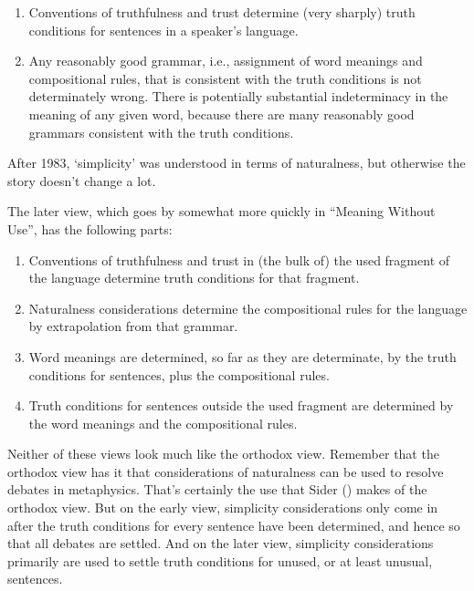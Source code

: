 \documentclass[
  11pt,
  letterpaper,
  DIV=11,
  numbers=noendperiod,
  twoside]{scrartcl}
\providecommand{\tightlist}{%
  \setlength{\itemsep}{0pt}\setlength{\parskip}{0pt}}
\begin{document}
\begin{enumerate}
\def\labelenumi{\arabic{enumi}.}
\tightlist
\item
  Conventions of truthfulness and trust determine (very sharply) truth
  conditions for sentences in a speaker's language.
\item
  Any reasonably good grammar, i.e., assignment of word meanings and
  compositional rules, that is consistent with the truth conditions is
  not determinately wrong. There is potentially substantial
  indeterminacy in the meaning of any given word, because there are many
  reasonably good grammars consistent with the truth conditions.
\end{enumerate}

After 1983, `simplicity' was understood in terms of naturalness, but
otherwise the story doesn't change a lot.

The later view, which goes by somewhat more quickly in ``Meaning Without
Use'', has the following parts:

\begin{enumerate}
\def\labelenumi{\arabic{enumi}.}
\tightlist
\item
  Conventions of truthfulness and trust in (the bulk of) the used
  fragment of the language determine truth conditions for that fragment.
\item
  Naturalness considerations determine the compositional rules for the
  language by extrapolation from that grammar.
\item
  Word meanings are determined, so far as they are determinate, by the
  truth conditions for sentences, plus the compositional rules.
\item
  Truth conditions for sentences outside the used fragment are
  determined by the word meanings and the compositional rules.
\end{enumerate}

Neither of these views look much like the orthodox view. Remember that
the orthodox view has it that considerations of naturalness can be used
to resolve debates in metaphysics. That's certainly the use that Sider
() makes of the orthodox view. But
on the early view, simplicity considerations only come in after the
truth conditions for every sentence have been determined, and hence so
that all debates are settled. And on the later view, simplicity
considerations primarily are used to settle truth conditions for unused,
or at least unusual, sentences.
\end{document}
